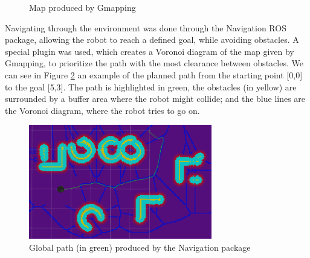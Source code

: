 \documentclass[11pt,a4paper]{article}
\begin{document}
\begin{figure}[ht!]%
	\centering
    \qquad  
    \caption{Map produced by Gmapping}
    \label{fig:gmapping}
\end{figure}

Navigating through the environment was done through the Navigation ROS package, allowing the robot to reach a defined goal, while avoiding obstacles. A special plugin  was used, which creates a Voronoi diagram of the map given by Gmapping, to prioritize the path with the most clearance between obstacles. We can see in Figure \ref{fig:globalPath} an example of the planned path from the starting point [0,0] to the goal [5,3]. The path is highlighted in green, the obstacles (in yellow) are surrounded by a buffer area where the robot might collide; and the blue lines are the Voronoi diagram, where the robot tries to go on.

\begin{figure}[h!]
	\centering
    \includegraphics[width=8cm]{globalplan53.png}
    \caption{Global path (in green) produced by the Navigation package}
    \label{fig:globalPath}
\end{figure}
\end{document}
